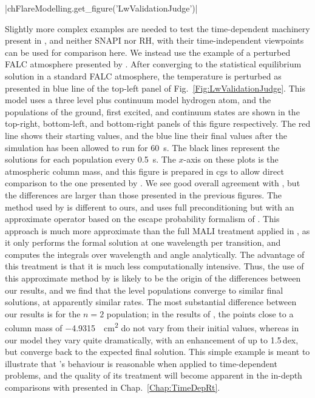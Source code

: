 \py[FlareModelling]|chFlareModelling.get_figure('LwValidationJudge')|

Slightly more complex examples are needed to test the time-dependent machinery present in \Lw{}, and neither SNAPI nor RH, with their time-independent viewpoints can be used for comparison here.
We instead use the example of a perturbed FALC atmosphere presented by \citet{Judge2017}.
After converging to the statistical equilibrium solution in a standard FALC atmosphere, the temperature is perturbed as presented in blue line of the top-left panel of Fig.~\ref{Fig:LwValidationJudge}.
This model uses a three level plus continuum model hydrogen atom, and the populations of the ground, first excited, and continuum states are shown in the top-right, bottom-left, and bottom-right panels of this figure respectively.
The red line shows their starting values, and the blue line their final values after the simulation has been allowed to run for \SI{60}{\second}.
The black lines represent the solutions for each population every \SI{0.5}{\second}.
The $x$-axis on these plots is the atmospheric column mass, and this figure is prepared in cgs to  allow direct comparison to the one presented by \citet{Judge2017}.
We see good overall agreement with \citet{Judge2017}, but the differences are larger than those presented in the previous figures.
The method used by \citet{Judge2017} is different to ours, and uses full preconditioning but with an approximate operator based on the escape probability formalism of \citet{Hummer1982}.
This approach is much more approximate than the full MALI treatment applied in \Lw{}, as it only performs the formal solution at one wavelength per transition, and computes the integrals over wavelength and angle analytically.
The advantage of this treatment is that it is much less computationally intensive.
Thus, the use of this approximate method by \citet{Judge2017} is likely to be the origin of the differences between our results, and we find that the level populations converge to similar final solutions, at apparently similar rates.
The most substantial difference between our results is for the $n=2$ population; in the results of \citet{Judge2017}, the points close to a column mass of \SI{-4.9315}{\per\square\centi\metre} do not vary from their initial values, whereas in our model they vary quite dramatically, with an enhancement of up to 1.5\,dex, but converge back to the expected final solution.
This simple example is meant to illustrate that \Lw{}'s behaviour is reasonable when applied to time-dependent problems, and the quality of its treatment will become apparent in the in-depth comparisons with \Radyn{} presented in Chap.~\ref{Chap:TimeDepRt}.

